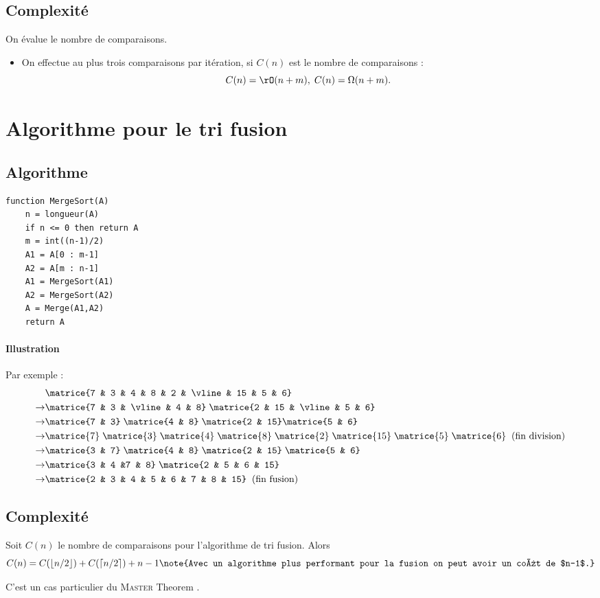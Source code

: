 \documentclass{mybourbaki}
\begin{document}
\subsection{Complexité}
On évalue le nombre de comparaisons.
\begin{itemize}
\item On effectue au plus trois comparaisons par itération, si $C(n)$ est le nombre de comparaisons : \[ C(n) = \rO(n+m), \; C(n) = \Omega(n+m).\]
\end{itemize}


\section{Algorithme pour le tri fusion}
\subsection{Algorithme}
\begin{lstlisting}
function MergeSort(A)
	n = longueur(A)
	if n <= 0 then return A
	m = int((n-1)/2)
	A1 = A[0 : m-1]
	A2 = A[m : n-1]
	A1 = MergeSort(A1)
	A2 = MergeSort(A2)
	A = Merge(A1,A2)
	return A
\end{lstlisting}

\paragraph{Illustration}Par exemple :
\begin{align*}
&\matrice{7 & 3 & 4 & 8 & 2 & \vline & 15 & 5 & 6} \\
\to & \matrice{7 & 3 & \vline & 4 & 8} \; \matrice{2 & 15 & \vline & 5 & 6} \\
\to & \matrice{7 & 3} \; \matrice{4 & 8} \; \matrice{2 & 15} \matrice{5 & 6} \\
\to & \matrice{7} \; \matrice{3} \; \matrice{4} \; \matrice{8} \; \matrice{2} \; \matrice{15} \; \matrice{5} \; \matrice{6} \; \; \text{(fin division)} \\
\to & \matrice{3 & 7} \; \matrice{4 & 8} \; \matrice{2 & 15} \; \matrice{5 & 6} \\
\to &\matrice{3 & 4 &7 & 8} \; \matrice{2 & 5 & 6 & 15} \\
\to &\matrice{2 & 3 & 4 & 5 & 6 & 7 & 8 & 15} \; \; \text{(fin fusion)}
\end{align*}

\subsection{Complexité}
Soit $C(n)$ le nombre de comparaisons pour l'algorithme de tri fusion. Alors \[ C(n) = C(\lfloor n/2 \rfloor) + C(\lceil n/2 \rceil) + n-1\note{Avec un algorithme plus performant pour la fusion on peut avoir un coût de $n-1$.}\]


C'est un cas particulier du \og \textsc{Master} Theorem \fg{}.
\end{document}
